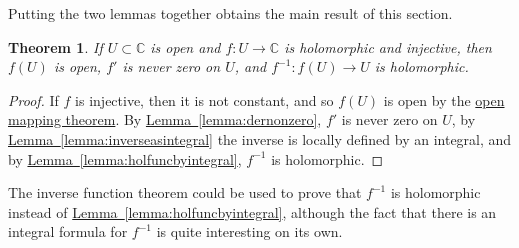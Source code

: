 \documentclass[12pt,openany]{book}
\newcommand{\C}{{\mathbb{C}}}
\theoremstyle{plain}
\newtheorem{thm}{Theorem}[section]
\theoremstyle{remark}
\theoremstyle{definition}
\theoremstyle{exercise}
\theoremstyle{example}
\newcommand{\lemmaref}[1]{\hyperref[#1]{Lemma~\ref*{#1}}}
\begin{document}
Putting the two lemmas together obtains the main result of this section.

\begin{thm}
If $U \subset \C$ is open and $f \colon U \to \C$ is holomorphic and
injective, then $f(U)$ is open, $f'$ is never zero on $U$, and $f^{-1}
\colon f(U) \to U$ is holomorphic.
\end{thm}

\begin{proof}
If $f$ is injective, then it is not constant, and so $f(U)$ is open by
the \hyperref[thm:OMT]{open mapping theorem}.
By \lemmaref{lemma:dernonzero}, $f'$ is never zero
on $U$, by \lemmaref{lemma:inverseasintegral} the inverse is locally defined
by an integral, and by
\lemmaref{lemma:holfuncbyintegral},
$f^{-1}$ is holomorphic.
\end{proof}

The inverse function theorem could be used to prove that $f^{-1}$ is
holomorphic instead of \lemmaref{lemma:holfuncbyintegral}, although the
fact that there is an integral formula for $f^{-1}$ is quite interesting on
its own.
\end{document}

